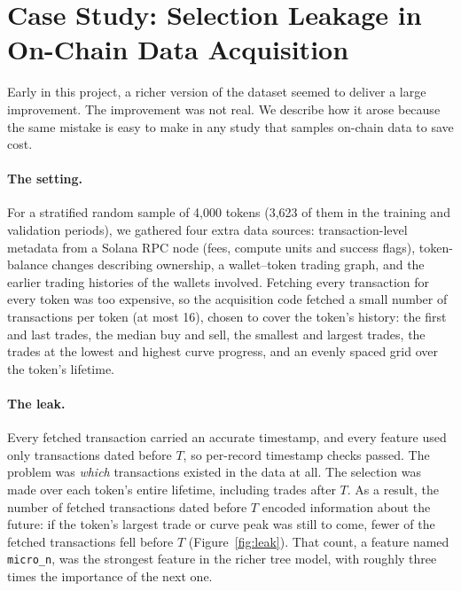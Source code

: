 \section{Case Study: Selection Leakage in On-Chain Data Acquisition}
\label{sec:leakage}

Early in this project, a richer version of the dataset seemed to deliver a large improvement. The improvement was not real. We describe how it arose because the same mistake is easy to make in any study that samples on-chain data to save cost.

\paragraph{The setting.}
For a stratified random sample of 4,000 tokens (3,623 of them in the training and validation periods), we gathered four extra data sources: transaction-level metadata from a Solana RPC node (fees, compute units and success flags), token-balance changes describing ownership, a wallet--token trading graph, and the earlier trading histories of the wallets involved. Fetching every transaction for every token was too expensive, so the acquisition code fetched a small number of transactions per token (at most 16), chosen to cover the token's history: the first and last trades, the median buy and sell, the smallest and largest trades, the trades at the lowest and highest curve progress, and an evenly spaced grid over the token's lifetime.

\paragraph{The leak.}
Every fetched transaction carried an accurate timestamp, and every feature used only transactions dated before $T$, so per-record timestamp checks passed. The problem was \emph{which} transactions existed in the data at all. The selection was made over each token's entire lifetime, including trades after $T$. As a result, the number of fetched transactions dated before $T$ encoded information about the future: if the token's largest trade or curve peak was still to come, fewer of the fetched transactions fell before $T$ (Figure~\ref{fig:leak}). That count, a feature named \texttt{micro\_n}, was the strongest feature in the richer tree model, with roughly three times the importance of the next one.

